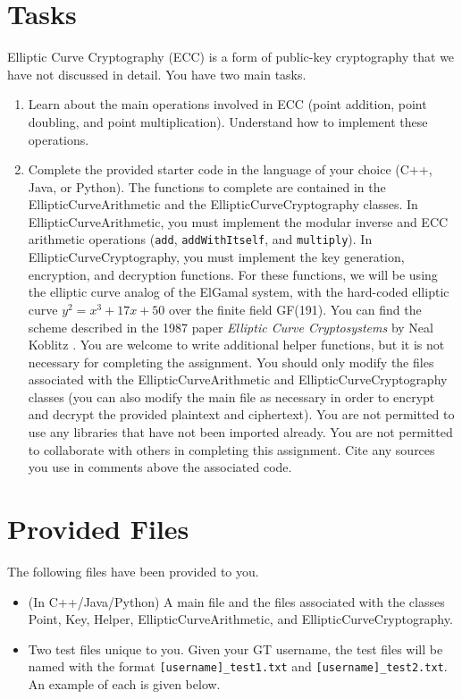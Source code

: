 \documentclass[12pt, letterpaper]{article}
\date{}
\begin{document}
\section*{Tasks}
Elliptic Curve Cryptography (ECC) is a form of public-key cryptography that we have not discussed in detail. You have two main tasks.
\begin{enumerate}
    \item Learn about the main operations involved in ECC (point addition, point doubling, and point multiplication). Understand how to implement these operations.
    \item Complete the provided starter code in the language of your choice (C++, Java, or Python). The functions to complete are contained in the EllipticCurveArithmetic and the EllipticCurveCryptography classes. In EllipticCurveArithmetic, you must implement the modular inverse and ECC arithmetic operations (\texttt{add}, \texttt{addWithItself}, and \texttt{multiply}). In EllipticCurveCryptography, you must implement the key generation, encryption, and decryption functions. For these functions, we will be using the elliptic curve analog of the ElGamal system, with the hard-coded elliptic curve $y^2 = x^3 + 17x + 50$ over the finite field GF(191). You can find the scheme described in the 1987 paper \textit{Elliptic Curve Cryptosystems} by Neal Koblitz \cite{koblitz87}. You are welcome to write additional helper functions, but it is not necessary for completing the assignment. You should only modify the files associated with the EllipticCurveArithmetic and EllipticCurveCryptography classes (you can also modify the main file as necessary in order to encrypt and decrypt the provided plaintext and ciphertext). You are not permitted to use any libraries that have not been imported already. You are not permitted to collaborate with others in completing this assignment. Cite any sources you use in comments above the associated code.
\end{enumerate}

\section*{Provided Files}
The following files have been provided to you.
\begin{itemize}
    \item (In C++/Java/Python) A main file and the files associated with the classes Point, Key, Helper, EllipticCurveArithmetic, and EllipticCurveCryptography.
    \item Two test files unique to you. Given your GT username, the test files will be named with the format \texttt{[username]\_test1.txt} and \texttt{[username]\_test2.txt}. An example of each is given below.
\end{itemize}
\end{document}

